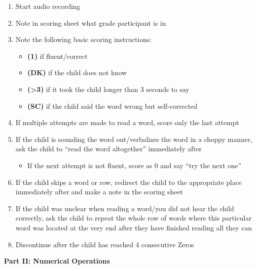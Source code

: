 \documentclass[]{book}
\providecommand{\tightlist}{%
  \setlength{\itemsep}{0pt}\setlength{\parskip}{0pt}}
\begin{document}
\begin{enumerate}
\def\labelenumi{\arabic{enumi}.}
\tightlist
\item
  Start audio recording
\item
  Note in scoring sheet what grade participant is in
\item
  Note the following basic scoring instructions:

  \begin{itemize}
  \tightlist
  \item
    \textbf{(1)} if fluent/correct
  \item
    \textbf{(DK)} if the child does not know
  \item
    \textbf{(\textgreater{}3)} if it took the child longer than 3 seconds to say
  \item
    \textbf{(SC)} if the child said the word wrong but self-corrected
  \end{itemize}
\item
  If multiple attempts are made to read a word, score only the last attempt
\item
  If the child is sounding the word out/verbalizes the word in a choppy manner, ask the child to ``read the word altogether'' immediately after

  \begin{itemize}
  \tightlist
  \item
    If the next attempt is not fluent, score as 0 and say ``try the next one''
  \end{itemize}
\item
  If the child skips a word or row, redirect the child to the appropriate place immediately after and make a note in the scoring sheet
\item
  If the child was unclear when reading a word/you did not hear the child correctly, ask the child to repeat the whole row of words where this particular word was located at the very end after they have finished reading all they can
\item
  Discontinue after the child has reached 4 consecutive Zeros
\end{enumerate}

\textbf{Part II: Numerical Operations}
\end{document}
